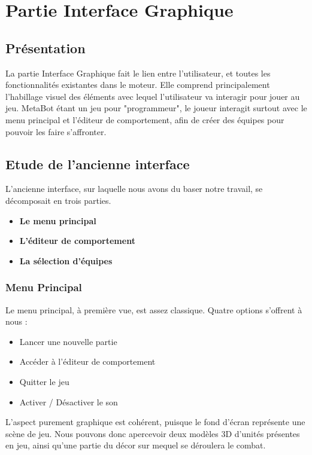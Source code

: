 \documentclass{report}
\begin{document}
\newpage
\chapter{Partie Interface Graphique}
\section{Présentation}
La partie Interface Graphique fait le lien entre l'utilisateur, et toutes les fonctionnalités existantes dans le moteur. Elle comprend principalement l'habillage visuel des éléments avec lequel l'utilisateur va interagir pour jouer au jeu. MetaBot étant un jeu pour "programmeur", le joueur interagit surtout avec le menu principal et l'éditeur de comportement, afin de créer des équipes pour pouvoir les faire s'affronter. \newline


\section{Etude de l'ancienne interface}
L'ancienne interface, sur laquelle nous avons du baser notre travail, se décomposait en trois parties.
\begin{itemize}
\item\textbf{Le menu principal}
\item\textbf{L'éditeur de comportement}
\item\textbf{La sélection d'équipes}
\end{itemize}
\subsection{Menu Principal}
Le menu principal, à première vue, est assez classique. Quatre options s'offrent à nous :
\begin{itemize}
\item{Lancer une nouvelle partie}
\item{Accéder à l'éditeur de comportement}
\item{Quitter le jeu}
\item{Activer / Désactiver le son}
\end{itemize}
L'aspect purement graphique est cohérent, puisque le fond d'écran représente une scène de jeu.
Nous pouvons donc apercevoir deux modèles 3D d'unités présentes en jeu, ainsi qu'une partie du décor sur mequel se déroulera le combat.
\end{document}
